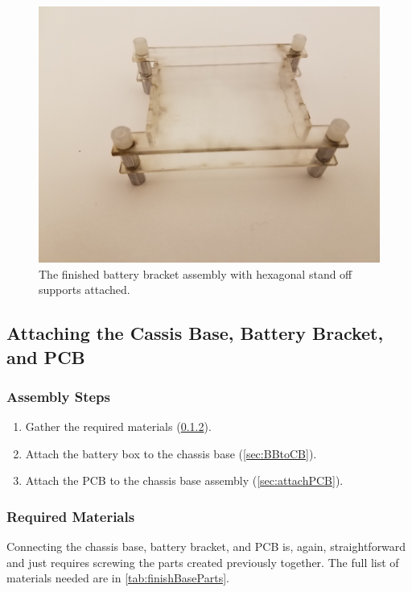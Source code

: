 \begin{figure}[h!]
\centering
\includegraphics[width=0.65\columnwidth, keepaspectratio]{./figs/20190102_141824.jpg}
\caption{The finished battery bracket assembly with hexagonal stand off supports attached.}
\label{fig:finalBatteryBracket}
\end{figure}

\subsection{Attaching the Cassis Base, Battery Bracket, and PCB}
\label{sec:finishBase}

\subsubsection{Assembly Steps}
\label{sec:finishBaseSteps}

\begin{enumerate}
\item Gather the required materials (\cref{sec:finishBaseMaterials}).
\item Attach the battery box to the chassis base (\cref{sec:BBtoCB}).
\item Attach the PCB to the chassis base assembly (\cref{sec:attachPCB}).
\end{enumerate}

\subsubsection{Required Materials}
\label{sec:finishBaseMaterials}

Connecting the chassis base, battery bracket, and PCB is, again, straightforward and just requires screwing the parts created previously together. The full list of materials needed are in \cref{tab:finishBaseParts}.

